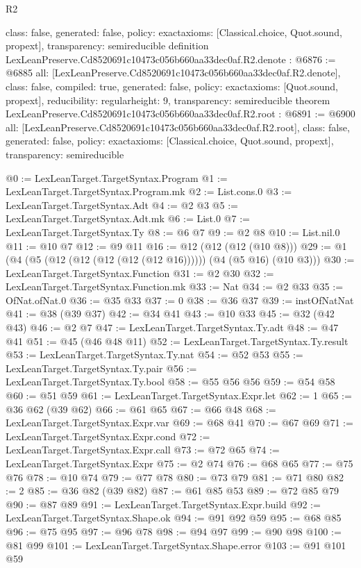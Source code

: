 \begin{lexlean}{R2}
\begin{coremodule}
{  class: false,
  generated: false,
  policy: exact{axioms: [Classical.choice, Quot.sound, propext]},
  transparency: semireducible
}
definition LexLeanPreserve.Cd8520691c10473c056b660aa33dec0af.R2.denote : @6876 := @6885 {
  all: [LexLeanPreserve.Cd8520691c10473c056b660aa33dec0af.R2.denote],
  class: false,
  compiled: true,
  generated: false,
  policy: exact{axioms: [Quot.sound, propext]},
  reducibility: regular{height: 9},
  transparency: semireducible
}
theorem LexLeanPreserve.Cd8520691c10473c056b660aa33dec0af.R2.root : @6891 := @6900 {
  all: [LexLeanPreserve.Cd8520691c10473c056b660aa33dec0af.R2.root],
  class: false,
  generated: false,
  policy: exact{axioms: [Classical.choice, Quot.sound, propext]},
  transparency: semireducible
}

@0 := LexLeanTarget.TargetSyntax.Program
@1 := LexLeanTarget.TargetSyntax.Program.mk
@2 := List.cons.{0}
@3 := LexLeanTarget.TargetSyntax.Adt
@4 := @2 @3
@5 := LexLeanTarget.TargetSyntax.Adt.mk
@6 := List.{0}
@7 := LexLeanTarget.TargetSyntax.Ty
@8 := @6 @7
@9 := @2 @8
@10 := List.nil.{0}
@11 := @10 @7
@12 := @9 @11
@16 := @12 (@12 (@12 (@10 @8)))
@29 := @1 (@4 (@5 (@12 (@12 (@12 (@12 (@12 @16)))))) (@4 (@5 @16) (@10 @3)))
@30 := LexLeanTarget.TargetSyntax.Function
@31 := @2 @30
@32 := LexLeanTarget.TargetSyntax.Function.mk
@33 := Nat
@34 := @2 @33
@35 := OfNat.ofNat.{0}
@36 := @35 @33
@37 := 0
@38 := @36 @37
@39 := instOfNatNat
@41 := @38 (@39 @37)
@42 := @34 @41
@43 := @10 @33
@45 := @32 (@42 @43)
@46 := @2 @7
@47 := LexLeanTarget.TargetSyntax.Ty.adt
@48 := @47 @41
@51 := @45 (@46 @48 @11)
@52 := LexLeanTarget.TargetSyntax.Ty.result
@53 := LexLeanTarget.TargetSyntax.Ty.nat
@54 := @52 @53
@55 := LexLeanTarget.TargetSyntax.Ty.pair
@56 := LexLeanTarget.TargetSyntax.Ty.bool
@58 := @55 @56 @56
@59 := @54 @58
@60 := @51 @59
@61 := LexLeanTarget.TargetSyntax.Expr.let
@62 := 1
@65 := @36 @62 (@39 @62)
@66 := @61 @65
@67 := @66 @48
@68 := LexLeanTarget.TargetSyntax.Expr.var
@69 := @68 @41
@70 := @67 @69
@71 := LexLeanTarget.TargetSyntax.Expr.cond
@72 := LexLeanTarget.TargetSyntax.Expr.call
@73 := @72 @65
@74 := LexLeanTarget.TargetSyntax.Expr
@75 := @2 @74
@76 := @68 @65
@77 := @75 @76
@78 := @10 @74
@79 := @77 @78
@80 := @73 @79
@81 := @71 @80
@82 := 2
@85 := @36 @82 (@39 @82)
@87 := @61 @85 @53
@89 := @72 @85 @79
@90 := @87 @89
@91 := LexLeanTarget.TargetSyntax.Expr.build
@92 := LexLeanTarget.TargetSyntax.Shape.ok
@94 := @91 @92 @59
@95 := @68 @85
@96 := @75 @95
@97 := @96 @78
@98 := @94 @97
@99 := @90 @98
@100 := @81 @99
@101 := LexLeanTarget.TargetSyntax.Shape.error
@103 := @91 @101 @59

\end{coremodule}
\end{lexlean}
